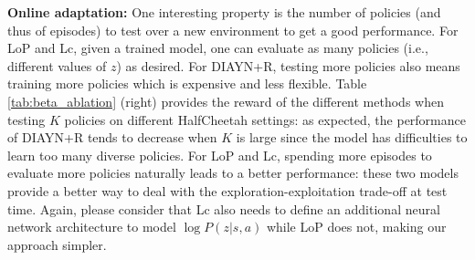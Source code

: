 

\textbf{Online adaptation:} One interesting property is the number of policies (and thus of episodes) to test over a new environment to get a good performance. For LoP and Lc, given a trained model, one can evaluate as many policies (i.e., different values of $z$) as desired. For DIAYN+R, testing more policies also means training more policies which is expensive and less flexible. Table \ref{tab:beta_ablation} (right) provides the reward of the different methods when testing $K$ policies on different HalfCheetah settings: as expected, the performance of DIAYN+R tends to decrease when $K$ is large since the model has difficulties to learn too many diverse policies. For LoP and Lc, spending more episodes to evaluate more policies naturally leads to a better performance: these two models provide a better way to deal with the exploration-exploitation trade-off at test time. Again, please consider that Lc also needs to define an additional neural network architecture to model $\log P(z|s,a)$ while LoP does not, making our approach simpler.%

